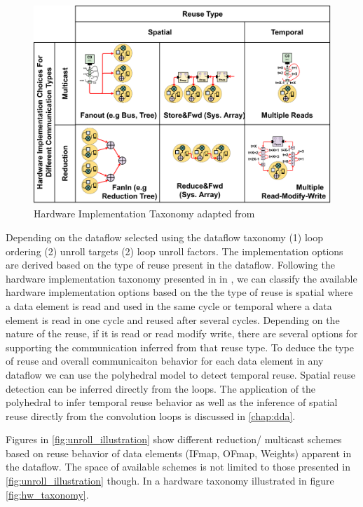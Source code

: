 \begin{figure}[ht]
    \centering
    \includegraphics[scale=0.58]{fig/hw_taxonomy.pdf}
    \caption{Hardware Implementation Taxonomy adapted from \cite{maestro}}
    \label{fig:hw_taxonomy}
\end{figure}


Depending on the dataflow selected using the dataflow taxonomy (1) loop ordering
(2) unroll targets (2) loop unroll factors. The implementation options are
derived based on the type of reuse present in the dataflow. Following the
hardware implementation taxonomy presented in in \cite{maestro}, we can classify
the available hardware implementation options based on the the type of reuse is
spatial where a data element is read and used in the same cycle or temporal
where a data element is read in one cycle and reused after several cycles.
Depending on the nature of the reuse, if it is read or read modify write, there
are several options for supporting the communication inferred from that reuse
type. To deduce the type of reuse and overall communicaiton behavior for each
data element in any dataflow we can use the polyhedral model to detect temporal
reuse. Spatial reuse detection can be inferred directly from the loops. The
application of the polyhedral to infer temporal reuse behavior as well as the
inference of spatial reuse directly from the convolution loops is discussed in
\autoref{chap:dda}.

Figures in \autoref{fig:unroll_illustration} show different reduction/ multicast
schemes based on reuse behavior of data elements (IFmap, OFmap, Weights)
apparent in the dataflow. The space of available schemes is not limited to those
presented in \autoref{fig:unroll_illustration} though. In \cite{maestro} a
hardware taxonomy illustrated in figure \autoref{fig:hw_taxonomy}.

